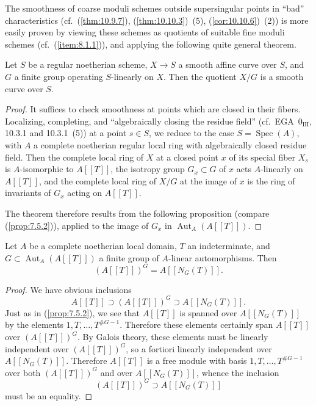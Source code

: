 The smoothness of coarse moduli schemes outside supersingular points in ``bad'' characteristics (cf.~(\ref{thm:10.9.7}), (\ref{thm:10.10.3})~(5), (\ref{cor:10.10.6})~(2)) is more easily proven by viewing these schemes as quotients of suitable fine moduli schemes (cf.~(\ref{item:8.1.1})), and applying the following quite general theorem.

\begin{theorem*}
Let $S$ be a regular noetherian scheme, $X \to S$ a smooth affine curve over $S$, and $G$ a finite group operating $S$-linearly on $X$. Then the quotient $X/G$ is a smooth curve over $S$.
\end{theorem*}

\begin{proof}
It suffices to check smoothness at points which are closed in their fibers. Localizing, completing, and ``algebraically closing the residue field'' (cf.~EGA~$0_{\mathrm{III}}$, 10.3.1 and 10.3.1~(5)) at a point $s \in S$, we reduce to the case $S = \operatorname{Spec}(A)$, with $A$ a complete noetherian regular local ring with algebraically closed residue field. Then the complete local ring of $X$ at a closed point $x$ of its special fiber $X_s$ is $A$-isomorphic to $A[[T]]$, the isotropy group $G_x \subset G$ of $x$ acts $A$-linearly on $A[[T]]$, and the complete local ring of $X/G$ at the image of $x$ is the ring of invariants of $G_x$ acting on $A[[T]]$.

The theorem therefore results from the following proposition (compare (\ref{prop:7.5.2})), applied to the image of $G_x$ in $\operatorname{Aut}_A(A[[T]])$.
\end{proof}

\begin{proposition*}
Let $A$ be a complete noetherian local domain, $T$ an indeterminate, and $G \subset \operatorname{Aut}_A(A[[T]])$ a finite group of $A$-linear automorphisms. Then
\[
(A[[T]])^G = A[[N_G(T)]] .
\]
\end{proposition*}

\begin{proof}
We have obvious inclusions
\[
A[[T]] \supset (A[[T]])^G \supset A[[N_G(T)]] .
\]
Just as in (\ref{prop:7.5.2}), we see that $A[[T]]$ is spanned over $A[[N_G(T)]]$ by the elements $1, T, \dots, T^{\#G-1}$. Therefore these elements certainly span $A[[T]]$ over $(A[[T]])^G$. By Galois theory, these elements must be linearly independent over $(A[[T]])^G$, so a fortiori linearly independent over $A[[N_G(T)]]$. Therefore $A[[T]]$ is a free module with basis $1, T, \dots, T^{\#G-1}$ over both $(A[[T]])^G$ and over $A[[N_G(T)]]$, whence the inclusion
\[
(A[[T]])^G \supset A[[N_G(T)]]
\]
must be an equality.
\end{proof}

